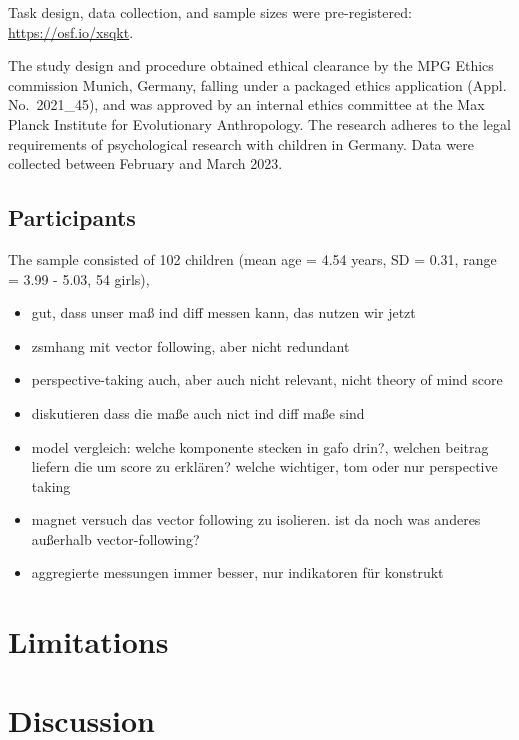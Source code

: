 \documentclass[
  man,floatsintext]{apa6}
\begin{document}
Task design, data collection, and sample sizes were pre-registered: \url{https://osf.io/xsqkt}.

The study design and procedure obtained ethical clearance by the MPG Ethics commission Munich, Germany, falling under a packaged ethics application (Appl. No.~2021\_45), and was approved by an internal ethics committee at the Max Planck Institute for Evolutionary Anthropology.
The research adheres to the legal requirements of psychological research with children in Germany.
Data were collected between February and March 2023.

\hypertarget{participants-2}{%
\subsection{Participants}\label{participants-2}}

The sample consisted of 102 children (mean age = 4.54 years, SD = 0.31, range = 3.99 - 5.03, 54 girls),

\begin{itemize}
\item
  gut, dass unser maß ind diff messen kann, das nutzen wir jetzt
\item
  zsmhang mit vector following, aber nicht redundant
\item
  perspective-taking auch, aber auch nicht relevant, nicht theory of mind score
\item
  diskutieren dass die maße auch nict ind diff maße sind
\item
  model vergleich: welche komponente stecken in gafo drin?,
  welchen beitrag liefern die um score zu erklären?
  welche wichtiger, tom oder nur perspective taking
\item
  magnet versuch das vector following zu isolieren.
  ist da noch was anderes außerhalb vector-following?
\item
  aggregierte messungen immer besser, nur indikatoren für konstrukt
\end{itemize}

\hypertarget{limitations}{%
\section{Limitations}\label{limitations}}

\hypertarget{discussion-1}{%
\section{Discussion}\label{discussion-1}}
\end{document}
